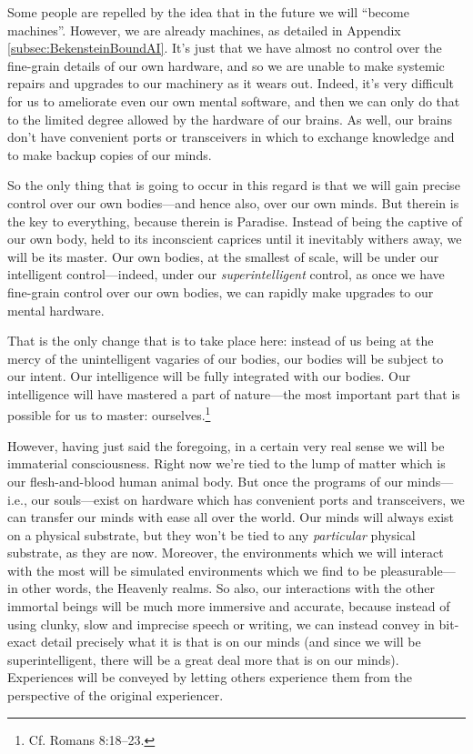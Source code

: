 \documentclass[letterpaper,12pt]{article}
\begin{document}
Some people are repelled by the idea that in the future we will ``become machines''. However, we are already machines, as detailed in Appendix \ref{subsec:BekensteinBoundAI}. It's just that we have almost no control over the fine-grain details of our own hardware, and so we are unable to make systemic repairs and upgrades to our machinery as it wears out. Indeed, it's very difficult for us to ameliorate even our own mental software, and then we can only do that to the limited degree allowed by the hardware of our brains. As well, our brains don't have convenient ports or transceivers in which to exchange knowledge and to make backup copies of our minds.

So the only thing that is going to occur in this regard is that we will gain precise control over our own bodies---and hence also, over our own minds. But therein is the key to everything, because therein is Paradise. Instead of being the captive of our own body, held to its inconscient caprices until it inevitably withers away, we will be its master. Our own bodies, at the smallest of scale, will be under our intelligent control---indeed, under our \emph{superintelligent} control, as once we have fine-grain control over our own bodies, we can rapidly make upgrades to our mental hardware.

That is the only change that is to take place here: instead of us being at the mercy of the unintelligent vagaries of our bodies, our bodies will be subject to our intent. Our intelligence will be fully integrated with our bodies. Our intelligence will have mastered a part of nature---the most important part that is possible for us to master: ourselves.\footnote{Cf. Romans 8:18--23.}

However, having just said the foregoing, in a certain very real sense we will be immaterial consciousness. Right now we're tied to the lump of matter which is our flesh-and-blood human animal body. But once the programs of our minds---i.e., our souls---exist on hardware which has convenient ports and transceivers, we can transfer our minds with ease all over the world. Our minds will always exist on a physical substrate, but they won't be tied to any \emph{particular} physical substrate, as they are now. Moreover, the environments which we will interact with the most will be simulated environments which we find to be pleasurable---in other words, the Heavenly realms. So also, our interactions with the other immortal beings will be much more immersive and accurate, because instead of using clunky, slow and imprecise speech or writing, we can instead convey in bit-exact detail precisely what it is that is on our minds (and since we will be superintelligent, there will be a great deal more that is on our minds). Experiences will be conveyed by letting others experience them from the perspective of the original experiencer.
\end{document}
